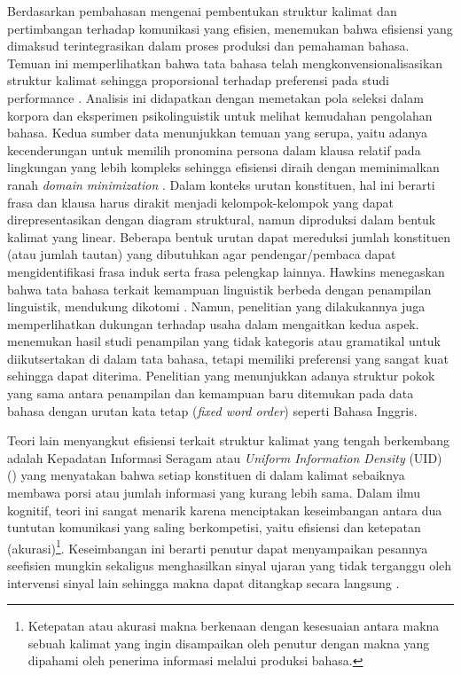 Berdasarkan pembahasan mengenai pembentukan struktur kalimat dan pertimbangan terhadap komunikasi yang efisien, \cite{hawkins2004efficiency} menemukan bahwa efisiensi yang dimaksud terintegrasikan dalam proses produksi dan pemahaman bahasa. Temuan ini memperlihatkan bahwa tata bahasa telah mengkonvensionalisasikan struktur kalimat sehingga proporsional terhadap preferensi pada studi performance \citep{hawkins2004efficiency}. Analisis ini didapatkan dengan memetakan pola seleksi dalam korpora dan eksperimen psikolinguistik untuk melihat kemudahan pengolahan bahasa. Kedua sumber data menunjukkan temuan yang serupa, yaitu adanya kecenderungan untuk memilih pronomina persona dalam klausa relatif pada lingkungan yang lebih kompleks sehingga efisiensi diraih dengan meminimalkan ranah \textit{domain minimization} \citep{hawkins2004efficiency}. Dalam konteks urutan konstituen, hal ini berarti frasa dan klausa harus dirakit menjadi kelompok-kelompok yang dapat direpresentasikan dengan diagram struktural, namun diproduksi dalam bentuk kalimat yang linear. Beberapa bentuk urutan dapat mereduksi jumlah konstituen (atau jumlah tautan) yang dibutuhkan agar pendengar/pembaca dapat mengidentifikasi frasa induk serta frasa pelengkap lainnya. Hawkins menegaskan bahwa tata bahasa terkait kemampuan linguistik berbeda dengan penampilan linguistik, mendukung dikotomi \cite{chomsky1965syntactic}. Namun, penelitian yang dilakukannya juga memperlihatkan dukungan terhadap usaha dalam mengaitkan kedua aspek. \cite{hawkins2004efficiency} menemukan hasil studi penampilan yang tidak kategoris atau gramatikal untuk diikutsertakan di dalam tata bahasa, tetapi memiliki preferensi yang sangat kuat sehingga dapat diterima. Penelitian \cite{hawkins2004efficiency} yang menunjukkan adanya struktur pokok yang sama antara penampilan dan kemampuan baru ditemukan pada data bahasa dengan urutan kata tetap (\textit{fixed word order}) seperti Bahasa Inggris. 

Teori lain menyangkut efisiensi terkait struktur kalimat yang tengah berkembang adalah Kepadatan Informasi Seragam atau \textit{Uniform Information Density} (UID) (\citealp{jaeger2007speakers, frank2008speaking}) yang menyatakan bahwa setiap konstituen di dalam kalimat  sebaiknya membawa porsi atau jumlah informasi yang kurang lebih sama. Dalam ilmu kognitif, teori ini sangat menarik karena menciptakan keseimbangan antara dua tuntutan komunikasi yang saling berkompetisi, yaitu efisiensi dan ketepatan (akurasi)\footnote{Ketepatan atau akurasi makna berkenaan dengan kesesuaian antara makna sebuah kalimat yang ingin disampaikan oleh penutur dengan makna yang dipahami oleh penerima informasi melalui produksi bahasa.}. Keseimbangan ini berarti penutur dapat menyampaikan pesannya seefisien mungkin sekaligus menghasilkan sinyal ujaran yang tidak terganggu oleh intervensi sinyal lain sehingga makna dapat ditangkap secara langsung \citep{jaeger2007speakers}.

